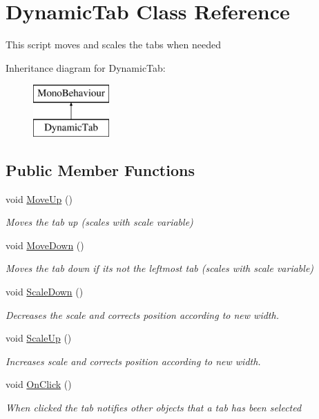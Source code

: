 \hypertarget{class_dynamic_tab}{}\section{Dynamic\+Tab Class Reference}
\label{class_dynamic_tab}


This script moves and scales the tabs when needed  


Inheritance diagram for Dynamic\+Tab\+:\begin{figure}[H]
\begin{center}
\leavevmode
\includegraphics[height=2.000000cm]{class_dynamic_tab}
\end{center}
\end{figure}
\subsection*{Public Member Functions}
\begin{DoxyCompactItemize}
\item 
void \hyperlink{class_dynamic_tab_a6aadee2864c08657e3e87eac95f6174a}{Move\+Up} ()
\begin{DoxyCompactList}\small\item\em Moves the tab up (scales with scale variable) \end{DoxyCompactList}\item 
void \hyperlink{class_dynamic_tab_a95fcdcd13d54ad12dfcd46375fd85647}{Move\+Down} ()
\begin{DoxyCompactList}\small\item\em Moves the tab down if it\textquotesingle{}s not the leftmost tab (scales with scale variable) \end{DoxyCompactList}\item 
void \hyperlink{class_dynamic_tab_acedc824d9b337ce9877170c90974ae89}{Scale\+Down} ()
\begin{DoxyCompactList}\small\item\em Decreases the scale and corrects position according to new width. \end{DoxyCompactList}\item 
void \hyperlink{class_dynamic_tab_ab215a9f1108a089155cef53d9a529661}{Scale\+Up} ()
\begin{DoxyCompactList}\small\item\em Increases scale and corrects position according to new width. \end{DoxyCompactList}\item 
void \hyperlink{class_dynamic_tab_a17b150a9b2c6d126ae719a1f20da9272}{On\+Click} ()
\begin{DoxyCompactList}\small\item\em When clicked the tab notifies other objects that a tab has been selected \end{DoxyCompactList}\end{DoxyCompactItemize}
